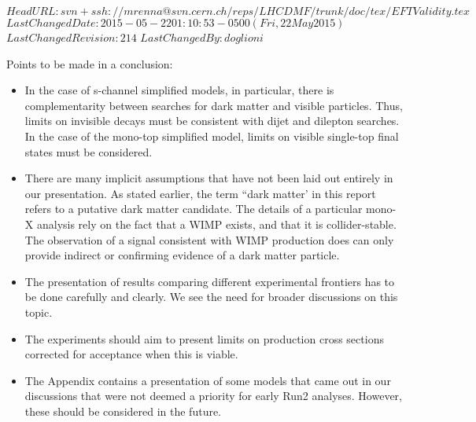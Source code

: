 \svnidlong
{$HeadURL: svn+ssh://mrenna@svn.cern.ch/reps/LHCDMF/trunk/doc/tex/EFTValidity.tex $}
{$LastChangedDate: 2015-05-22 01:10:53 -0500 (Fri, 22 May 2015) $}
{$LastChangedRevision: 214 $}
{$LastChangedBy: doglioni $}

Points to be made in a conclusion:
\begin{itemize}

\item In the case of s-channel simplified models, in particular, there is complementarity between searches for dark matter and visible particles.   Thus, limits on invisible decays must be consistent with dijet and dilepton searches.  In the case of the mono-top simplified model, limits on visible single-top final states must be considered.

\item There are many implicit assumptions that have not been laid out entirely in our presentation.   As stated earlier, the term ``dark matter' in this report refers to a putative dark matter candidate.
  The details of a particular mono-X analysis rely on the fact that a
  WIMP exists, and that it is collider-stable.   The observation of a
  signal consistent with WIMP production does can only provide indirect or confirming evidence of a dark matter particle.

\item The presentation of results comparing different experimental frontiers has to be done carefully and clearly.  We see the need for broader discussions on this topic.

\item The experiments should aim to present limits on production cross sections corrected for acceptance when this is viable.  

\item The Appendix contains a presentation of some models that came out in our discussions that were not deemed a priority for early Run2 analyses.  However, these should be considered in the future.

\end{itemize}
